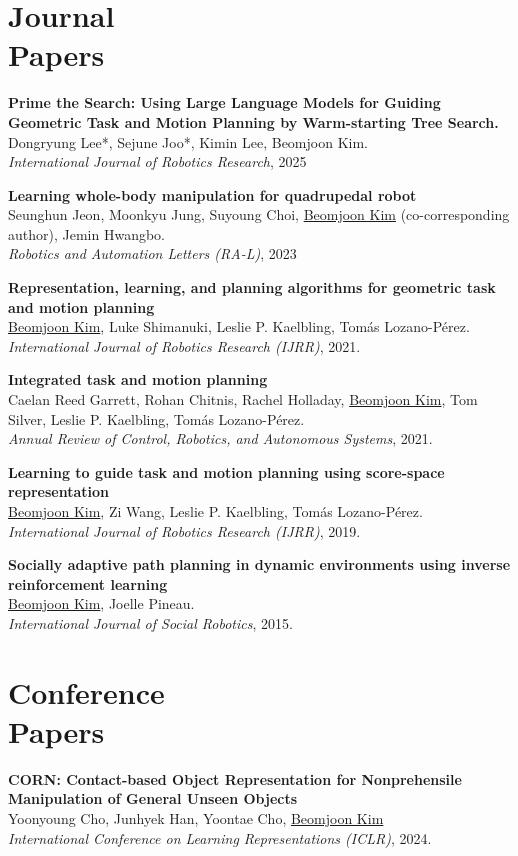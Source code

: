 \documentclass[line,margin,letterpaper]{res}
\begin{document}
\begin{resume}
\section{Journal\\ Papers}

\textbf{Prime the Search: Using Large Language Models for Guiding Geometric Task and Motion Planning by Warm-starting Tree Search.}\\
Dongryung Lee*, Sejune Joo*, Kimin Lee, Beomjoon Kim.\\
{\sl International Journal of Robotics Research}, 2025


\textbf{Learning whole-body manipulation for quadrupedal robot}\\
Seunghun Jeon, Moonkyu Jung, Suyoung Choi, \underline{Beomjoon Kim} (co-corresponding author), Jemin Hwangbo. \\
{\sl Robotics and Automation Letters (RA-L)}, 2023

\textbf{Representation, learning, and planning algorithms for geometric task and motion planning}\\
\underline{Beomjoon Kim}, Luke Shimanuki, Leslie P. Kaelbling, Tom\'as Lozano-P\'erez.\\
{\sl International Journal of Robotics Research (IJRR)}, 2021.

\textbf{Integrated task and motion planning}\\
Caelan Reed Garrett, Rohan Chitnis, Rachel Holladay, \underline{Beomjoon Kim}, Tom Silver, Leslie P. Kaelbling, Tom\'as Lozano-P\'erez.\\
{\sl Annual Review of Control, Robotics, and Autonomous Systems}, 2021.

\textbf{Learning to guide task and motion planning using score-space representation}\\
\underline{Beomjoon Kim}, Zi Wang, Leslie P. Kaelbling, Tom\'as Lozano-P\'erez.\\
{\sl International Journal of Robotics Research (IJRR)}, 2019.

\textbf{Socially adaptive path planning in dynamic environments using inverse reinforcement learning}\\
\underline{Beomjoon Kim}, Joelle Pineau.\\
{\sl International Journal of Social Robotics}, 2015.

\section{Conference \\Papers}
\textbf{CORN: Contact-based Object Representation for Nonprehensile Manipulation of General Unseen Objects}\\
Yoonyoung Cho, Junhyek Han, Yoontae Cho, \underline{Beomjoon Kim} \\
{\sl International Conference on Learning Representations (ICLR)}, 2024.


\end{resume}
\end{document}
